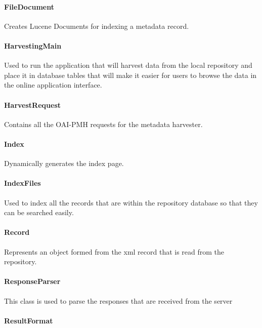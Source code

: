 \documentclass[a4paper,11pt]{article}
\begin{document}
\paragraph{FileDocument}

Creates Lucene Documents for indexing a metadata record.

\paragraph{HarvestingMain}

Used to run the application that will harvest data from the local repository and place it in database tables that will make it easier for users to browse the data in the online application interface.

\paragraph{HarvestRequest}

Contains all the OAI-PMH requests for the metadata harvester.

\paragraph{Index}

Dynamically generates the index page.

\paragraph{IndexFiles}

Used to index all the records that are within the repository database so that they can be searched easily.

\paragraph{Record}

Represents an object formed from the xml record that is read from the repository.

\paragraph{ResponseParser}

This class is used to parse the responses that are received from the server

\paragraph{ResultFormat}
\end{document}

